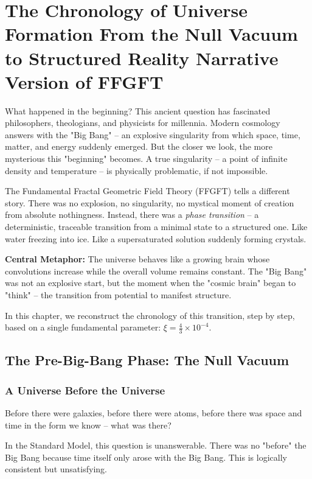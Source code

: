 \chapter{The Chronology of Universe Formation  From the Null Vacuum to Structured Reality  Narrative Version of FFGFT}


	
	What happened in the beginning? This ancient question has fascinated philosophers, theologians, and physicists for millennia. Modern cosmology answers with the "Big Bang" -- an explosive singularity from which space, time, matter, and energy suddenly emerged. But the closer we look, the more mysterious this "beginning" becomes. A true singularity -- a point of infinite density and temperature -- is physically problematic, if not impossible.
	
	The Fundamental Fractal Geometric Field Theory (FFGFT) tells a different story. There was no explosion, no singularity, no mystical moment of creation from absolute nothingness. Instead, there was a \textit{phase transition} -- a deterministic, traceable transition from a minimal state to a structured one. Like water freezing into ice. Like a supersaturated solution suddenly forming crystals.
	
	\textbf{Central Metaphor:} The universe behaves like a growing brain whose convolutions increase while the overall volume remains constant. The "Big Bang" was not an explosive start, but the moment when the "cosmic brain" began to "think" -- the transition from potential to manifest structure.
	
	In this chapter, we reconstruct the chronology of this transition, step by step, based on a single fundamental parameter: $\xi = \frac{4}{3} \times 10^{-4}$.
	
	\section{The Pre-Big-Bang Phase: The Null Vacuum}
	
	\subsection{A Universe Before the Universe}
	
	Before there were galaxies, before there were atoms, before there was space and time in the form we know -- what was there?
	
	In the Standard Model, this question is unanswerable. There was no "before" the Big Bang because time itself only arose with the Big Bang. This is logically consistent but unsatisfying.
	
